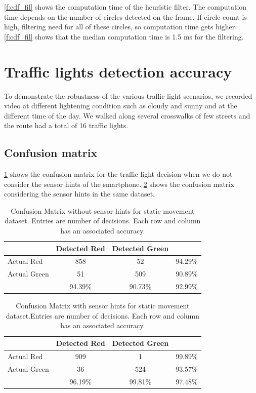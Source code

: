 \ref{f:cdf_fil} shows the computation time of the heuristic filter.
The computation time depends on the number of circles detected on the frame.
If circle count is high, filtering need for all of these circles, so computation time gets higher.
\ref{f:cdf_fil} shows that the median computation time is 1.5 ms for the filtering. 





\section{Traffic lights detection accuracy}
\label{s:acc}
To demonstrate the robustness of the various traffic light scenarios, we recorded video at different lightening condition such as cloudy and sunny and at the different time of the day.
We walked along several crosswalks of few streets and the route had a total of 16 traffic lights.

\subsection{Confusion matrix}
\ref{t:con_nocrp} shows the confusion matrix for the traffic light decision when we do not consider the sensor hints of the smartphone.
\ref{t:con_crp} shows the confusion matrix considering the sensor hints in the same dataset.

\begin{table}[h!]
  \centering
  \caption{Confusion Matrix without sensor hints for static movement dataset. Entries are number of decisions. Each row and column has an associated accuracy.}
  \label{t:con_nocrp}
  \begin{tabular}{  l | c | c | r }
   
     & Detected Red & Detected Green &  \\
    \hline
    Actual Red & 858 & 52 & 94.29\% \\
    \hline
    Actual Green & 51 & 509 & 90.89\% \\
    \hline
    & 94.39\% & 90.73\% & 92.99\% \\
    
  \end{tabular}
\end{table}

\begin{table}[h!]
  \centering
  \caption{Confusion Matrix with sensor hints for static movement dataset.Entries are number of decisions. Each row and column has an associated accuracy.}
  \label{t:con_crp}
  \begin{tabular}{  l | c | c | r }
   
     & Detected Red & Detected Green &  \\
    \hline
    Actual Red & 909 & 1 & 99.89\% \\
    \hline
    Actual Green & 36 & 524 & 93.57\% \\
    \hline
    & 96.19\% & 99.81\% & 97.48\% \\
    
  \end{tabular}
\end{table}

